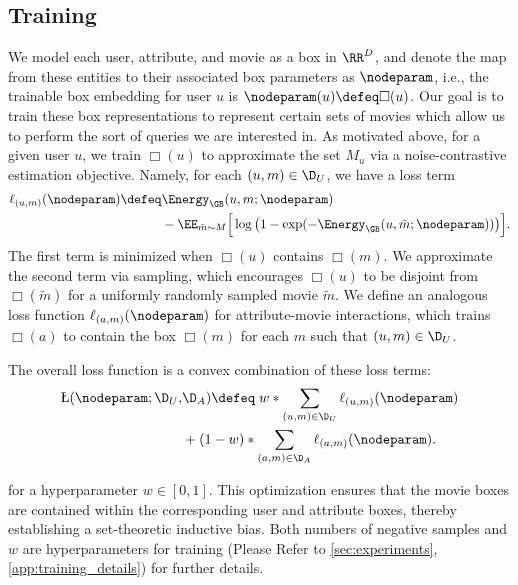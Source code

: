 

\subsection{Training}
We model each user, attribute, and movie as a box in $\RR^D$, and denote the map from these entities to their associated box parameters as $\nodeparam$, i.e., the trainable box embedding for user $u$ is $\nodeparam(u) \defeq \Box(u)$. Our goal is to train these box representations to represent certain sets of movies which allow us to perform the sort of queries we are interested in. As motivated above, for a given user $u$, we train  $\Box(u)$ to approximate the set $M_u$ via a noise-contrastive estimation objective. Namely, for each $(u,m) \in \D_U$, we have a loss term
\begin{align*}
\ell_{(u,m)}(\nodeparam) \defeq & \Energy_\GB(u,m;\nodeparam) \notag \\
& - \EE_{\tilde m \sim M} \Big[\log\big(1 - \exp(-\Energy_\GB(u,\tilde m; \nodeparam))\big)\Big].
\end{align*}
{The first term is minimized when $\Box(u)$ contains $\Box(m)$. We approximate the second term via sampling, which encourages $\Box(u)$ to be disjoint from $\Box(\widetilde m)$ for a uniformly randomly sampled movie $\widetilde m$. We define an analogous loss function $\ell_{(a,m)}(\nodeparam)$ for attribute-movie interactions, which trains $\Box(a)$ to contain the box $\Box(m)$ for each $m$ such that $(u,m) \in \D_U$.}

The overall loss function is a convex combination of these loss terms:
\begin{align*}
\L(\nodeparam; \D_U,& \D_A ) \defeq \; w \ast \sum_{(u,m)\in \D_U}\ell_{(u,m)}(\nodeparam) \notag \\
& + (1-w) \ast \sum_{(a,m) \in \D_A}\ell_{(a,m)}(\nodeparam).
\end{align*}

for a hyperparameter $w \in [0,1]$. This optimization ensures that the movie boxes are contained within the corresponding user and attribute boxes, thereby establishing a set-theoretic inductive bias. {Both numbers of negative samples and $w$ are hyperparameters for training (Please Refer to \cref{sec:experiments}, \cref{app:training_details}) for further details.} 


